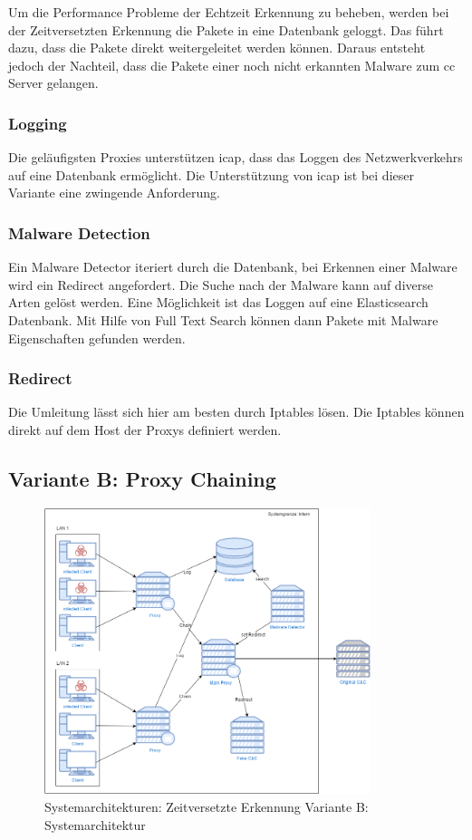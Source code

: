 Um die Performance Probleme der Echtzeit Erkennung zu beheben, werden bei der Zeitversetzten Erkennung die Pakete in eine Datenbank geloggt. Das führt dazu, dass die Pakete direkt weitergeleitet werden können. Daraus entsteht jedoch der Nachteil, dass die Pakete einer noch nicht erkannten Malware zum \gls{cc} Server gelangen.

\subsubsection{Logging}
Die geläufigsten Proxies unterstützen \gls{icap}, dass das Loggen des Netzwerkverkehrs auf eine Datenbank ermöglicht. Die Unterstützung von \gls{icap} ist bei dieser Variante eine zwingende Anforderung.

\subsubsection{Malware Detection}
Ein Malware Detector iteriert durch die Datenbank, bei Erkennen einer Malware wird ein Redirect angefordert. Die Suche nach der Malware kann auf diverse Arten gelöst werden. Eine Möglichkeit ist das Loggen auf eine Elasticsearch Datenbank. Mit Hilfe von Full Text Search können dann Pakete mit Malware Eigenschaften gefunden werden.

\subsubsection{Redirect}
Die Umleitung lässt sich hier am besten durch Iptables lösen. Die Iptables können direkt auf dem Host der Proxys definiert werden.

\subsection{Variante B: Proxy Chaining}

\begin{figure}[H]
	\centering
	\includegraphics[width=0.85\textwidth]{img/Architektur-ZE-B.png}
	\caption{Systemarchitekturen: Zeitversetzte Erkennung Variante B: Systemarchitektur}
	\label{fig:Zeitversetzte Erkennung Variante B: Systemarchitektur}
\end{figure}

